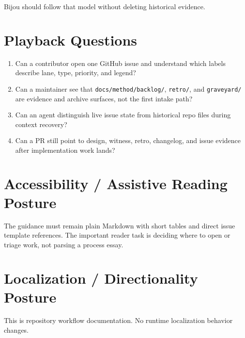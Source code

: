 Bijou should follow that model without deleting historical evidence.

\section{Playback Questions}\label{record-207-playback-questions}

\begin{enumerate}
\def\labelenumi{\arabic{enumi}.}
\tightlist
\item
  Can a contributor open one GitHub issue and understand which labels describe lane, type, priority, and legend?
\item
  Can a maintainer see that \texttt{d\allowbreak{}o\allowbreak{}c\allowbreak{}s\allowbreak{}/\allowbreak{}m\allowbreak{}e\allowbreak{}t\allowbreak{}h\allowbreak{}o\allowbreak{}d\allowbreak{}/\allowbreak{}b\allowbreak{}a\allowbreak{}c\allowbreak{}k\allowbreak{}l\allowbreak{}o\allowbreak{}g\allowbreak{}/}, \texttt{r\allowbreak{}e\allowbreak{}t\allowbreak{}r\allowbreak{}o\allowbreak{}/}, and \texttt{g\allowbreak{}r\allowbreak{}a\allowbreak{}v\allowbreak{}e\allowbreak{}y\allowbreak{}a\allowbreak{}r\allowbreak{}d\allowbreak{}/} are evidence and archive surfaces, not the first intake path?
\item
  Can an agent distinguish live issue state from historical repo files during context recovery?
\item
  Can a PR still point to design, witness, retro, changelog, and issue evidence after implementation work lands?
\end{enumerate}

\section{Accessibility / Assistive Reading Posture}\label{record-207-accessibility-assistive-reading-posture}

The guidance must remain plain Markdown with short tables and direct issue template references. The important reader task is deciding where to open or triage work, not parsing a process essay.

\section{Localization / Directionality Posture}\label{record-207-localization-directionality-posture}

This is repository workflow documentation. No runtime localization behavior changes.

